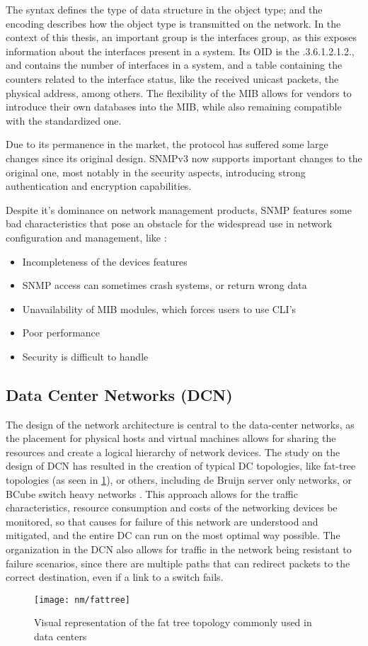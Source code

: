 \par The syntax defines the type of data structure in the object type; and the encoding describes how the object type is transmitted on the network. In the context
of this thesis, an important group is the interfaces group, as this exposes information about the interfaces present in a system. Its OID is the .3.6.1.2.1.2., 
and contains the number of interfaces in a system, and a table containing the counters related to the interface status, like the received unicast packets, the 
physical address, among others. The flexibility of the MIB allows for vendors to introduce their own databases into the MIB, while also remaining compatible 
with the standardized one.

\par Due to its permanence in the market, the protocol has suffered some large changes since its original design. SNMPv3 now supports important changes to the
original one, most notably in the security aspects, introducing strong authentication and encryption capabilities.

\par Despite it's dominance on network management products, SNMP features some bad characteristics that pose an obstacle for the widespread use in network
configuration and management, like \cite{schonwalder_overview_2003}: 

\begin {itemize}
    \item Incompleteness of the devices features
    \item SNMP access can sometimes crash systems, or return wrong data
    \item Unavailability of MIB modules, which forces users to use CLI's
    \item Poor performance 
    \item Security is difficult to handle
\end {itemize}

\subsection {Data Center Networks (DCN)}

\par The design of the network architecture is central to the data-center networks, as the placement for physical hosts and virtual machines allows for sharing the 
resources and create a logical hierarchy of network devices. The study on the design of DCN has resulted in the creation of typical DC topologies, like fat-tree
topologies (as seen in \ref{fig:fattree}), or others, including de Bruijn server only networks, or BCube switch heavy networks \cite{popa_cost_2010}. This approach
allows for the traffic characteristics, resource consumption and costs of the networking devices be monitored, so that causes for failure of this network are
understood and mitigated, and the entire DC can run on the most optimal way possible. The organization in the DCN also allows for traffic in the network being
resistant to failure scenarios, since there are multiple paths that can redirect packets to the correct destination, even if a link to a switch fails.

\begin{figure} [!htbp]
    \centering
    \texttt{[image: nm/fattree]}
    \caption{Visual representation of the fat tree topology commonly used in data centers}
    \label{fig:fattree}
\end{figure}

